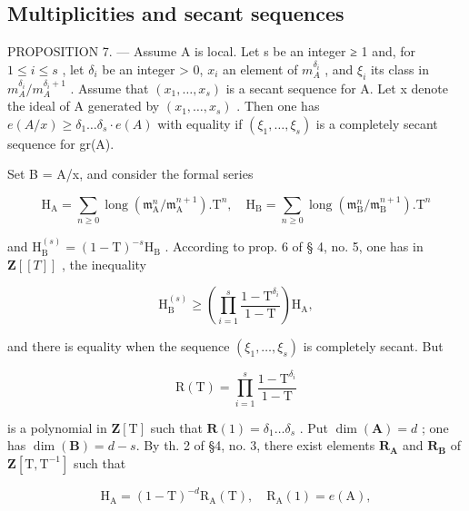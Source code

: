 \subsection{Multiplicities and secant sequences}

PROPOSITION 7. --- Assume A is local. Let s be an integer ≥ 1 and, for \(1 \leqslant i \leqslant s\) , let \(\delta_{i}\) be an integer \textgreater{} 0, \(x_{i}\) an element of \(m_{A}^{\delta_{i}}\) , and \(\xi_{i}\) its class in \(m_{A}^{\delta_{i}}/m_{A}^{\delta_{i}+1}\) . Assume that \((x_{1}, \ldots, x_{s})\) is a secant sequence for A. Let x denote the ideal of A generated by \((x_{1}, \ldots, x_{s})\) . Then one has \(e(A/x) \geqslant \delta_{1} \ldots \delta_{s} \cdot e(A)\) with equality if \((\xi_{1}, \ldots, \xi_{s})\) is a completely secant sequence for gr(A).

Set B = A/x, and consider the formal series

\[
\mathrm{H} _ {\mathrm{A}} = \sum_ {n \geqslant 0} \operatorname{long} (\mathfrak {m} _ {\mathrm{A}} ^ {n} / \mathfrak {m} _ {\mathrm{A}} ^ {n + 1}). \mathrm{T} ^ {n}, \quad \mathrm{H} _ {\mathrm{B}} = \sum_ {n \geqslant 0} \operatorname{long} (\mathfrak {m} _ {\mathrm{B}} ^ {n} / \mathfrak {m} _ {\mathrm{B}} ^ {n + 1}). \mathrm{T} ^ {n}
\]

and \(\mathrm{H}_{\mathrm{B}}^{(s)} = (1 - \mathrm{T})^{-s}\mathrm{H}_{\mathrm{B}}\) . According to prop. 6 of § 4, no. 5, one has in \(\mathbf{Z}[[T]]\) , the inequality

\[
\mathrm{H} _ {\mathrm{B}} ^ {(s)} \geqslant \left(\prod_ {i = 1} ^ {s} \frac {1 - \mathrm{T} ^ {\delta_ {i}}}{1 - \mathrm{T}}\right) \mathrm{H} _ {\mathrm{A}},
\]

and there is equality when the sequence \((\xi_{1}, \ldots, \xi_{s})\) is completely secant. But

\[
\mathrm{R(T)} = \prod_ {i = 1} ^ {s} \frac {1 - \mathrm{T} ^ {\delta_ {i}}}{1 - \mathrm{T}}
\]

is a polynomial in \(\mathbf{Z}[\mathrm{T}]\) such that \(\mathbf{R}(1) = \delta_1 \ldots \delta_s\) . Put \(\dim(\mathbf{A}) = d\) ; one has \(\dim(\mathbf{B}) = d - s\). By th. 2 of §4, no. 3, there exist elements \(\mathbf{R}_{\mathbf{A}}\) and \(\mathbf{R}_{\mathbf{B}}\) of \(\mathbf{Z}[\mathrm{T}, \mathrm{T}^{-1}]\) such that

\[
\mathrm{H} _ {\mathrm{A}} = (1 - \mathrm{T}) ^ {- d} \mathrm{R} _ {\mathrm{A}} (\mathrm{T}), \quad \mathrm{R} _ {\mathrm{A}} (1) = e (\mathrm{A}),
\]

